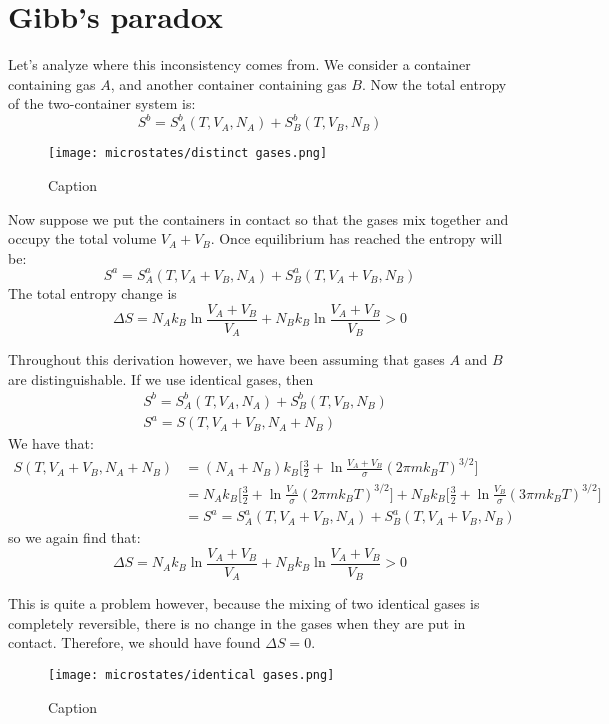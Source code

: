 \documentclass[a4paper,11pt,oneside]{book}
\begin{document}
\section{Gibb's paradox}

Let's analyze where this inconsistency comes from. We consider a container containing gas $A$, and another container containing gas $B$. Now the total entropy of the two-container system is:
\begin{equation}
    S^b = S_A^b(T,V_A,N_A) + S_B^b(T,V_B,N_B)
\end{equation}
\begin{figure}[h!]
    \centering
    \texttt{[image: microstates/distinct gases.png]}
    \caption{Caption}
    \label{fig:my_label}
\end{figure}
Now suppose we put the containers in contact so that the gases mix together and occupy the total volume $V_A+V_B$. Once equilibrium has reached the entropy will be:
\begin{equation}
    S^a =  S_A^a(T,V_A+V_B,N_A) + S_B^a(T,V_A+V_B,N_B)
\end{equation}
The total entropy change is
\begin{equation}
    \Delta S = N_A k_B\ln \frac{V_A+V_B}{V_A} + N_B k_B\ln \frac{V_A+V_B}{V_B}  > 0
\end{equation}

Throughout this derivation however, we have been assuming that gases $A$ and $B$ are distinguishable. If we use identical gases, then
\begin{align}
    &S^b = S_A^b(T,V_A,N_A) + S_B^b(T,V_B,N_B)\\
    &S^a = S(T,V_A+V_B,N_A+N_B)
\end{align}
We have that:
\begin{align}
    S(T,V_A+V_B,N_A+N_B) &= (N_A+N_B)k_B \bigg[\frac{3}{2}+\ln \frac{V_A+V_B}{\sigma}(2 \pi m k_B T)^{3/2}\bigg] \\
    &= N_Ak_B \bigg[\frac{3}{2}+\ln \frac{V_A}{\sigma}(2 \pi m k_B T)^{3/2}\bigg] + N_Bk_B \bigg[\frac{3}{2}+\ln \frac{V_B}{\sigma}(3 \pi m k_B T)^{3/2}\bigg]\\
    &=  S^a =  S_A^a(T,V_A+V_B,N_A) + S_B^a(T,V_A+V_B,N_B)
\end{align}
so we again find that:
\begin{equation}
      \Delta S = N_A k_B\ln \frac{V_A+V_B}{V_A} + N_B k_B\ln \frac{V_A+V_B}{V_B}  > 0
\end{equation}

This is quite a problem however, because the mixing of two identical gases is completely reversible, there is no change in the gases when they are put in contact. Therefore, we should have found $\Delta S = 0$. 
\begin{figure}[h!]
    \centering
    \texttt{[image: microstates/identical gases.png]} 
    \caption{Caption}
    \label{fig:my_label}
\end{figure}
\end{document}
